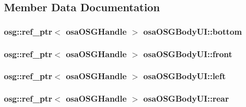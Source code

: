 \subsection{Member Data Documentation}
\hypertarget{classosa_o_s_g_body_u_i_a83f9d28bb8372a0e6772fcef3217e132}{
\subsubsection[{bottom}]{\setlength{\rightskip}{0pt plus 5cm}osg\-::ref\-\_\-ptr$<$ {\bf osa\-O\-S\-G\-Handle} $>$ osa\-O\-S\-G\-Body\-U\-I\-::bottom\hspace{0.3cm}{\ttfamily [protected]}}}\label{classosa_o_s_g_body_u_i_a83f9d28bb8372a0e6772fcef3217e132}
\hypertarget{classosa_o_s_g_body_u_i_adae724839022e0f6dffdad27939da0f2}{
\subsubsection[{front}]{\setlength{\rightskip}{0pt plus 5cm}osg\-::ref\-\_\-ptr$<$ {\bf osa\-O\-S\-G\-Handle} $>$ osa\-O\-S\-G\-Body\-U\-I\-::front\hspace{0.3cm}{\ttfamily [protected]}}}\label{classosa_o_s_g_body_u_i_adae724839022e0f6dffdad27939da0f2}
\hypertarget{classosa_o_s_g_body_u_i_a850b2ab2b5a8bd278ad22c00a6313502}{
\subsubsection[{left}]{\setlength{\rightskip}{0pt plus 5cm}osg\-::ref\-\_\-ptr$<$ {\bf osa\-O\-S\-G\-Handle} $>$ osa\-O\-S\-G\-Body\-U\-I\-::left\hspace{0.3cm}{\ttfamily [protected]}}}\label{classosa_o_s_g_body_u_i_a850b2ab2b5a8bd278ad22c00a6313502}
\hypertarget{classosa_o_s_g_body_u_i_aa32fb4a77a38fdefe326191750129319}{
\subsubsection[{rear}]{\setlength{\rightskip}{0pt plus 5cm}osg\-::ref\-\_\-ptr$<$ {\bf osa\-O\-S\-G\-Handle} $>$ osa\-O\-S\-G\-Body\-U\-I\-::rear\hspace{0.3cm}{\ttfamily [protected]}}}\label{classosa_o_s_g_body_u_i_aa32fb4a77a38fdefe326191750129319}
